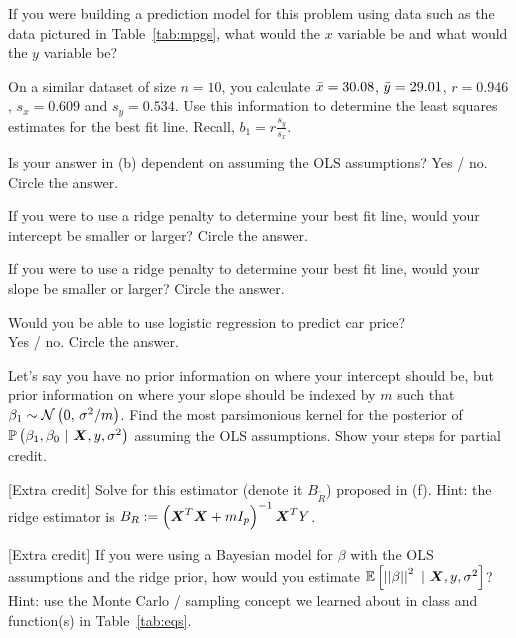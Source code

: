 \documentclass[12pt]{article}
\begin{document}


\benum
{} If you were building a prediction model for this problem using data such as the data pictured in Table~\ref{tab:mpgs}, what would the $x$ variable be and what would the $y$ variable be? 

 On a similar dataset of size $n = 10$, you calculate $\bar{x} = 30.08$, $\bar{y} = 29.01$, $r = 0.946$, $s_x = 0.609$ and $s_y = 0.534$. Use this information to determine the least squares estimates for the best fit line. Recall, $b_1 = r\frac{s_y}{s_x}$. 

 Is your answer in (b) dependent on assuming the OLS assumptions? Yes / no. Circle the answer.   \vspace{-0.7cm}

 If you were to use a ridge penalty to determine your best fit line, would your intercept be smaller or larger? Circle the answer.   \vspace{-0.7cm}

 If you were to use a ridge penalty to determine your best fit line, would your slope be smaller or larger? Circle the answer.   \vspace{-0.7cm}

 Would you be able to use logistic regression to predict car price? \\ Yes / no. Circle the answer.   \vspace{-0.7cm}

 Let's say you have no prior information on where your intercept should be, but prior information on where your slope should be indexed by $m$ such that $\beta_1 \sim \mathcal{N}\left(0,\,\sigma^2 / m\right)$. Find the most parsimonious kernel for the posterior of $\mathbb{P}\left(\beta_1, \beta_0~|~\boldsymbol{X}, y, \sigma^2\right)$ assuming the OLS assumptions. Show your steps for partial credit. 

 [Extra credit] Solve for this  estimator (denote it $B_{\tilde{R}}$) proposed in (f). Hint: the ridge estimator is $B_R := \left(\boldsymbol{X}^T\boldsymbol{X} +m I_p\right)^{-1} \boldsymbol{X}^T Y$.

 [Extra credit] If you were using a Bayesian model for $\beta$ with the OLS assumptions and the ridge prior, how would you estimate $\mathbb{E}\left[\left|\left|\beta\right|\right|^2~|~\boldsymbol{X}, y, \sigma^2\right]$? Hint: use the Monte Carlo / sampling concept we learned about in class and function(s) in Table~\ref{tab:eqs}.
\end{document}

